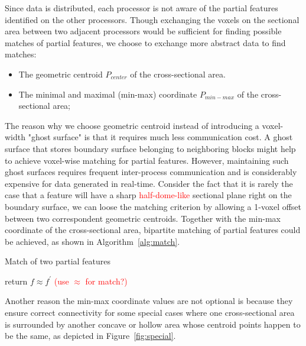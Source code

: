 \documentclass[10pt, conference, compsocconf]{IEEEtran}
\begin{document}
Since data is distributed, each processor is not aware of the partial features identified on the other processors. Though exchanging the voxels on the sectional area between two adjacent processors would be sufficient for finding possible matches of partial features, we choose to exchange more abstract data to find matches:

\begin{itemize}
	\item The geometric centroid $P_{center}$ of the cross-sectional area.
	\item The minimal and maximal (min-max) coordinate $P_{min-max}$ of the cross-sectional area;
\end{itemize}

The reason why we choose geometric centroid instead of introducing a voxel-width "ghost surface" is that it requires much less communication cost. A ghost surface that stores boundary surface belonging to neighboring blocks might help to achieve voxel-wise matching for partial features. However, maintaining such ghost surfaces requires frequent inter-process communication and is considerably expensive for data generated in real-time. Consider the fact that it is rarely the case that a feature will have a sharp \textcolor{red}{half-dome-like} sectional plane right on the boundary surface, we can loose the matching criterion by allowing a 1-voxel offset between two correspondent geometric centroids. Together with the min-max coordinate of the cross-sectional area, bipartite matching of partial features could be achieved, as shown in Algorithm~\ref{alg:match}.

\begin{algorithm}
\caption{Match of two partial features}
	\begin{algorithmic}[1]
			\STATE return $f \approx f^{'}$ \textcolor{red}{(use $\approx$ for match?)}
		\ENDIF
	\end{algorithmic}
\label{alg:match}
\end{algorithm}

Another reason the min-max coordinate values are not optional is because they ensure correct connectivity for some special cases where one cross-sectional area is surrounded by another concave or hollow area whose centroid points happen to be the same, as depicted in Figure~\ref{fig:special}.
\end{document}
